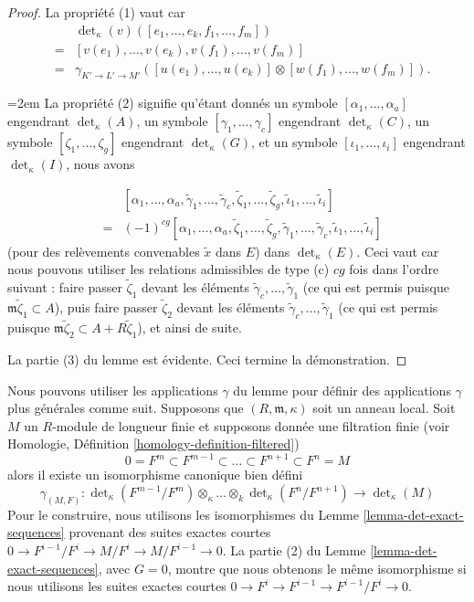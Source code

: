 \begin{proof}
\medskip\noindent
La propriété (1) vaut car
\begin{eqnarray*}
& & \det\nolimits_\kappa(v)([e_1, \ldots, e_k, f_1, \ldots, f_m]) \\
& = &
[v(e_1), \ldots, v(e_k), v(f_1), \ldots, v(f_m)] \\
& = &
\gamma_{K' \to L' \to M'}([u(e_1), \ldots, u(e_k)]
\otimes [w(f_1), \ldots, w(f_m)]).
\end{eqnarray*}
{\emergencystretch=2em La propriété (2) signifie qu'étant donnés un symbole
$[\alpha_1, \ldots, \alpha_a]$ engendrant $\det_\kappa(A)$,
un symbole $[\gamma_1, \ldots, \gamma_c]$ engendrant $\det_\kappa(C)$,
un symbole $[\zeta_1, \ldots, \zeta_g]$ engendrant $\det_\kappa(G)$, et
un symbole $[\iota_1, \ldots, \iota_i]$ engendrant $\det_\kappa(I)$,
nous avons\par}
\begin{eqnarray*}
& & [\alpha_1, \ldots, \alpha_a, \tilde\gamma_1, \ldots, \tilde\gamma_c,
\tilde\zeta_1, \ldots, \tilde\zeta_g, \tilde\iota_1, \ldots, \tilde\iota_i] \\
& = &
(-1)^{cg} [\alpha_1, \ldots, \alpha_a, \tilde\zeta_1, \ldots, \tilde\zeta_g,
\tilde\gamma_1, \ldots, \tilde\gamma_c, \tilde\iota_1, \ldots, \tilde\iota_i]
\end{eqnarray*}
(pour des relèvements convenables $\tilde{x}$ dans $E$) dans $\det_\kappa(E)$.
Ceci vaut car nous pouvons utiliser les relations admissibles de type (c)
$cg$ fois dans l'ordre suivant : faire passer
$\tilde\zeta_1$ devant les éléments
$\tilde\gamma_c, \ldots, \tilde\gamma_1$
(ce qui est permis puisque $\mathfrak m\tilde\zeta_1 \subset A$),
puis faire passer $\tilde\zeta_2$ devant les éléments
$\tilde\gamma_c, \ldots, \tilde\gamma_1$
(ce qui est permis puisque $\mathfrak m\tilde\zeta_2 \subset A + R\tilde\zeta_1$),
et ainsi de suite.

\medskip\noindent
La partie (3) du lemme est évidente.
Ceci termine la démonstration.
\end{proof}

\noindent
Nous pouvons utiliser les applications $\gamma$ du lemme pour définir des applications
$\gamma$ plus générales comme suit. Supposons que $(R, \mathfrak m, \kappa)$ soit un
anneau local. Soit $M$ un $R$-module de longueur finie et supposons donnée
une filtration finie (voir
Homologie, Définition \ref{homology-definition-filtered})
$$
0 = F^m \subset F^{m - 1} \subset \ldots \subset F^{n + 1} \subset F^n = M
$$
alors il existe un isomorphisme canonique bien défini
$$
\gamma_{(M, F)} :
\det\nolimits_\kappa(F^{m - 1}/F^m) \otimes_\kappa \ldots \otimes_k 
\det\nolimits_\kappa(F^n/F^{n + 1})
\longrightarrow
\det\nolimits_\kappa(M)
$$
Pour le construire, nous utilisons les isomorphismes du Lemme \ref{lemma-det-exact-sequences}
provenant des suites exactes courtes
$0 \to F^{i - 1}/F^i \to M/F^i \to M/F^{i - 1} \to 0$.
La partie (2) du Lemme \ref{lemma-det-exact-sequences}, avec $G = 0$, montre
que nous obtenons le même isomorphisme si nous utilisons les suites exactes courtes
$0 \to F^i \to F^{i - 1} \to F^{i - 1}/F^i \to 0$.

